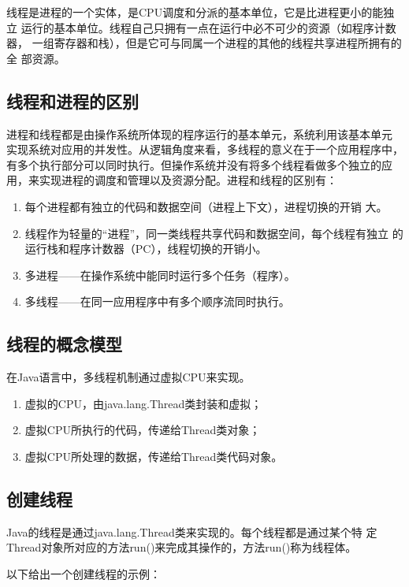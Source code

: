 线程是进程的一个实体，是CPU调度和分派的基本单位，它是比进程更小的能独立
运行的基本单位。线程自己只拥有一点在运行中必不可少的资源（如程序计数器，
一组寄存器和栈），但是它可与同属一个进程的其他的线程共享进程所拥有的全
部资源。

\subsection{线程和进程的区别}

进程和线程都是由操作系统所体现的程序运行的基本单元，系统利用该基本单元
实现系统对应用的并发性。从逻辑角度来看，多线程的意义在于一个应用程序中，
有多个执行部分可以同时执行。但操作系统并没有将多个线程看做多个独立的应
用，来实现进程的调度和管理以及资源分配。进程和线程的区别有：

\begin{enumerate}
\item 每个进程都有独立的代码和数据空间（进程上下文），进程切换的开销
  大。
\item 线程作为轻量的“进程”，同一类线程共享代码和数据空间，每个线程有独立
  的运行栈和程序计数器（PC），线程切换的开销小。
\item 多进程——在操作系统中能同时运行多个任务（程序）。
\item 多线程——在同一应用程序中有多个顺序流同时执行。
\end{enumerate}

\subsection{线程的概念模型}

在Java语言中，多线程机制通过虚拟CPU来实现。

\begin{enumerate}
\item 虚拟的CPU，由java.lang.Thread类封装和虚拟；
\item 虚拟CPU所执行的代码，传递给Thread类对象；
\item 虚拟CPU所处理的数据，传递给Thread类代码对象。
\end{enumerate}

\subsection{创建线程}

Java的线程是通过java.lang.Thread类来实现的。每个线程都是通过某个特
定Thread对象所对应的方法run()来完成其操作的，方法run()称为线程体。

以下给出一个创建线程的示例：

